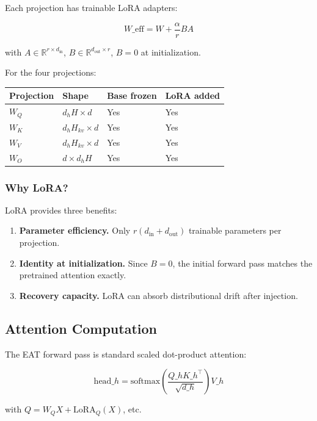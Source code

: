 Each projection has trainable LoRA adapters:

\[
W\_\text{eff} = W + \frac{\alpha}{r} B A
\tag{4.1}
\]

with $A \in \mathbb{R}^{r \times d_\text{in}}$, $B \in \mathbb{R}^{d_\text{out} \times r}$, 
$B = 0$ at initialization.

For the four projections:

\begin{table}[H]
\centering
\small
\begin{tabular}{llll}
\toprule
\textbf{Projection} & \textbf{Shape} & \textbf{Base frozen} & \textbf{LoRA added} \\
\midrule
$W_Q$ & $d_h H \times d$ & Yes & Yes \\
$W_K$ & $d_h H_{kv} \times d$ & Yes & Yes \\
$W_V$ & $d_h H_{kv} \times d$ & Yes & Yes \\
$W_O$ & $d \times d_h H$ & Yes & Yes \\
\bottomrule
\end{tabular}
\end{table}

\subsubsection{Why LoRA?}

LoRA provides three benefits:

\begin{enumerate}
\item \textbf{Parameter efficiency.} Only $r(d_\text{in} + d_\text{out})$ trainable
  parameters per projection.
\item \textbf{Identity at initialization.} Since $B = 0$, the initial forward pass
  matches the pretrained attention exactly.
\item \textbf{Recovery capacity.} LoRA can absorb distributional drift after
  injection.

\end{enumerate}
\subsection{Attention Computation}

The EAT forward pass is standard scaled dot-product attention:

\[
\text{head}\_h = \text{softmax}\!\left(\frac{Q\_h K\_h^\top}{\sqrt{d\_h}}\right) V\_h
\tag{4.2}
\]

with $Q = W_Q X + \text{LoRA}_Q(X)$, etc.

